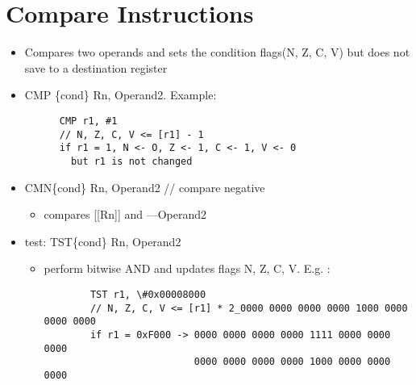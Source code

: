 \section{Compare Instructions}
  \begin{itemize}
    \item Compares two operands and sets the condition flags(N, Z, C, V) but does not
    save to a destination register\\
    \item CMP \{cond\} Rn, Operand2. Example:
    \begin{lstlisting}
      CMP r1, #1
      // N, Z, C, V <= [r1] - 1
      if r1 = 1, N <- O, Z <- 1, C <- 1, V <- 0
        but r1 is not changed
    \end{lstlisting}

    \item CMN\{cond\} Rn, Operand2 // compare negative
    \begin{itemize}
      \item compares [[Rn]] and ---Operand2
    \end{itemize}
    \item test: TST\{cond\} Rn, Operand2
    \begin{itemize}
      \item perform bitwise AND and updates flags N, Z, C, V. E.g. :
      \begin{lstlisting}
        TST r1, \#0x00008000
        // N, Z, C, V <= [r1] * 2_0000 0000 0000 0000 1000 0000 0000 0000
        if r1 = 0xF000 -> 0000 0000 0000 0000 1111 0000 0000 0000
                          0000 0000 0000 0000 1000 0000 0000 0000
      \end{lstlisting}
    \end{itemize}


\end{itemize}

